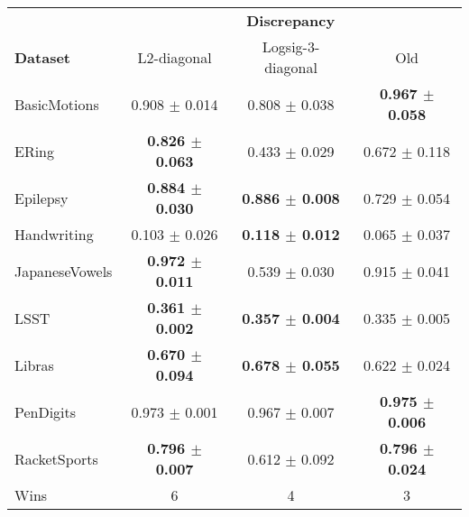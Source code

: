 \begin{tabular}{lccc}
\toprule
{} & \multicolumn{3}{c}{\textbf{Discrepancy}} \\
\textbf{Dataset} &          L2-diagonal &   Logsig-3-diagonal &                Old \\
\midrule
BasicMotions    &    0.908 $\pm$ 0.014 &  0.808 $\pm$ 0.038 &  \textbf{0.967 $\pm$ 0.058} \\
ERing           &    \textbf{0.826 $\pm$ 0.063} &  0.433 $\pm$ 0.029 &  0.672 $\pm$ 0.118 \\
Epilepsy        &    \textbf{0.884 $\pm$ 0.030} &  \textbf{0.886 $\pm$ 0.008} &  0.729 $\pm$ 0.054 \\
Handwriting     &    0.103 $\pm$ 0.026 &  \textbf{0.118 $\pm$ 0.012} &  0.065 $\pm$ 0.037 \\
JapaneseVowels  &    \textbf{0.972 $\pm$ 0.011} &  0.539 $\pm$ 0.030 &  0.915 $\pm$ 0.041 \\
LSST            &    \textbf{0.361 $\pm$ 0.002} &  \textbf{0.357 $\pm$ 0.004} &  0.335 $\pm$ 0.005 \\
Libras          &    \textbf{0.670 $\pm$ 0.094} &  \textbf{0.678 $\pm$ 0.055} &  0.622 $\pm$ 0.024 \\
PenDigits       &    0.973 $\pm$ 0.001 &  0.967 $\pm$ 0.007 &  \textbf{0.975 $\pm$ 0.006} \\
RacketSports    &    \textbf{0.796 $\pm$ 0.007} &  0.612 $\pm$ 0.092 &  \textbf{0.796 $\pm$ 0.024} \\
\midrule
Wins &            6 &                 4 &    3 \\
\bottomrule
\end{tabular}
